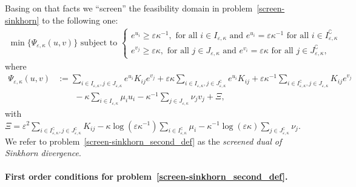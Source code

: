 \documentclass{article}
\begin{document}
Basing on that facts we ``screen'' the feasibility domain in problem~\eqref{screen-sinkhorn} to the following one:
\begin{align}
\label{screen-sinkhorn_second_def}
\min\{\Psi_{\varepsilon, \kappa}(u,v)\} \text { subject to } 
\begin{cases}
e^{u_i} \geq \varepsilon\kappa^{-1}, \text{ for all } i \in I_{\varepsilon,\kappa} \text{ and } e^{u_i} = \varepsilon\kappa^{-1} \text{ for all } i \in I^\complement_{\varepsilon,\kappa}\\
e^{v_j} \geq \varepsilon\kappa, \text{ for all } j \in J_{\varepsilon,\kappa} \text{ and } e^{v_i} = \varepsilon\kappa \text{ for all } j \in J^\complement_{\varepsilon,\kappa},
\end{cases}
\end{align}
where 
\begin{align*}
\Psi_{\varepsilon,\kappa}(u, v) &:= \sum_{i\in I_{\varepsilon,\kappa}, j \in J_{\varepsilon,\kappa}}e^{u_i}K_{ij}e^{v_j} 
+ \varepsilon\kappa \sum_{i\in I_{\varepsilon,\kappa}, j\in J^\complement_{\varepsilon,\kappa}} e^{u_i}K_{ij} 
+ \varepsilon\kappa^{-1} \sum_{i \in I^\complement_{\varepsilon,\kappa}, j \in J_{\varepsilon,\kappa}} K_{ij}e^{v_j}\\
& \qquad - \kappa\sum_{i \in I_{\varepsilon,\kappa}}\mu_i u_i - \kappa^{-1} \sum_{j\in J_{\varepsilon,\kappa}} \nu_jv_j
+ \Xi,
\end{align*}
with $\Xi = \varepsilon^2 \sum_{i \in I^\complement_{\varepsilon,\kappa}, j \in J^\complement_{\varepsilon,\kappa}} K_{ij} -\kappa \log(\varepsilon\kappa^{-1})\sum_{i \in I^\complement_{\varepsilon,\kappa}}\mu_i - \kappa^{-1} \log(\varepsilon\kappa)\sum_{j\in J^\complement_{\varepsilon,\kappa}} \nu_j$.
We refer to problem~\eqref{screen-sinkhorn_second_def} as the \emph{screened dual of Sinkhorn divergence}.

\paragraph{First order conditions for problem~\eqref{screen-sinkhorn_second_def}.}
\end{document}
